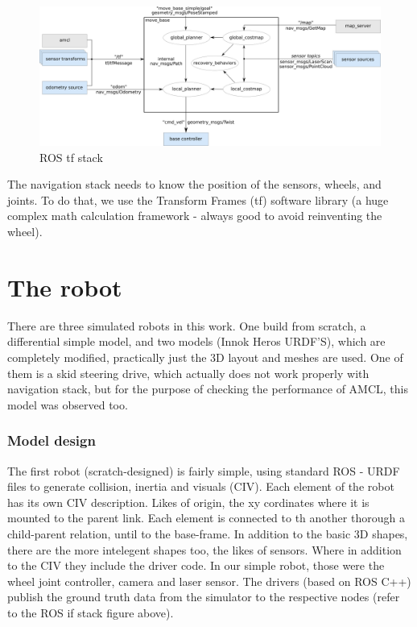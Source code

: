 \documentclass[10pt,journal,compsoc]{IEEEtran}
\begin{document}
    \begin{figure}[thptb]
        \centering
        \includegraphics[width=\linewidth]{overview_tf.png}
        \caption{ROS tf stack}
        \label{fig:robot2}
    \end{figure}

    The	navigation stack needs to know the position	of the sensors, wheels, and joints. To do that, we use the	Transform Frames (tf) software library (a huge complex math calculation framework - always good to avoid reinventing the wheel).	

    \section{The robot}
    There are three simulated robots in this work. One build from scratch, a differential simple model, and two models (Innok Heros URDF'S), which are completely modified, practically just the 3D layout and meshes are used. One of them is a skid steering drive, which actually does not work properly with navigation stack, but for the purpose of checking the performance of AMCL, this model was observed too.
    
    \subsubsection{Model design}
    The first robot (scratch-designed) is fairly simple, using standard ROS - URDF files to generate collision, inertia and visuals (CIV). Each element of the robot has its own CIV description. Likes of origin, the xy cordinates where it is mounted to the parent link. Each element is connected to th another thorough a child-parent relation, until to the base-frame. In addition to the basic 3D shapes, there are the more intelegent shapes too, the likes of sensors. Where in addition to the CIV they include the driver code. In our simple robot, those were the wheel joint controller, camera and laser sensor. The drivers (based on ROS C++) publish the ground truth data from the simulator to the respective nodes (refer to the ROS if stack figure above).
\end{document}
